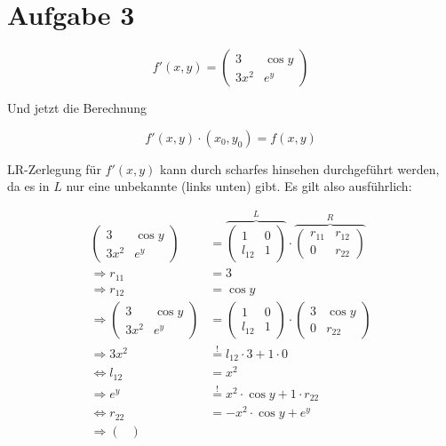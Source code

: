 \section*{Aufgabe 3}
\[f' (x,y) = \begin{pmatrix}
	3     & \cos y\\
	3 x^2 & e^y
\end{pmatrix}\]

Und jetzt die Berechnung

\[f'(x, y) \cdot (x_0, y_0) = f(x,y)\]

LR-Zerlegung für $f'(x, y)$ kann durch scharfes hinsehen durchgeführt
werden, da es in $L$ nur eine unbekannte (links unten) gibt. Es gilt
also ausführlich:

\begin{align}
	\begin{pmatrix}
		3     & \cos y\\
		3 x^2 & e^y
	\end{pmatrix}
	&=
	\overbrace{\begin{pmatrix}
		1      & 0\\
		l_{12} & 1
	\end{pmatrix}}^L \cdot 
	\overbrace{\begin{pmatrix}
		r_{11} & r_{12}\\
		0      & r_{22}
	\end{pmatrix}}^R\\
	\Rightarrow r_{11} &= 3\\
	\Rightarrow r_{12} &= \cos y\\
	\Rightarrow \begin{pmatrix}
		3     & \cos y\\
		3 x^2 & e^y
	\end{pmatrix}
	&=
	\begin{pmatrix}
		1      & 0\\
		l_{12} & 1
	\end{pmatrix} \cdot 
	\begin{pmatrix}
		3 & \cos y\\
		0 & r_{22}
	\end{pmatrix}\\
	\Rightarrow 3x^2 &\stackrel{!}{=} l_{12} \cdot 3 + 1 \cdot 0\\
	\Leftrightarrow l_{12} &= x^2\\
	\Rightarrow e^y &\stackrel{!}{=} x^2 \cdot \cos y + 1 \cdot r_{22}\\
	\Leftrightarrow r_{22} &= -x^2 \cdot \cos y + e^y\\
	\Rightarrow \begin{pmatrix}

\end{pmatrix}
\end{align}
